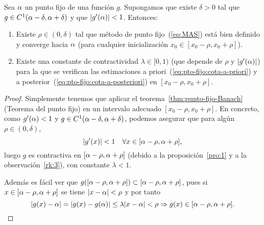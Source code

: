 \begin{theorem}
  \label{thm:punto-fijo-convergencia-local}
  Sea $\alpha$ un punto fijo de una función $g$. Supongamos que existe
  $\delta>0$ tal que $g\in C^1(\alpha-\delta,\alpha+\delta)$ y que
  $|g'(\alpha)|<1$. Entonces:
  \begin{enumerate}
  \item Existe $\rho\in (0,\delta)$ tal que método de punto
    fijo~(\ref{eq:MAS}) está bien definido y converge hacia $\alpha$
    (para cualquier inicialización $x_0 \in [x_0-\rho,x_0+\rho]$).
  \item Existe una constante de contractividad $\lambda\in [0,1)$ (que
    depende de $\rho$ y $|g'(\alpha)|$) para la que se verifican las
    estimaciones a priori~(\ref{eq:pto-fijo:cota-a-priori}) y a
    posterior~(\ref{eq:pto-fijo:cota-a-posteriori}) en
    $[x_0-\rho,x_0+\rho]$.
  \end{enumerate}
  \begin{proof}
    Simplemente tenemos que aplicar el
    teorema~\ref{thm:punto-fijo-Banach} (Teorema del punto fijo) en un
    intervalo adecuado $[x_0-\rho,x_0+\rho]$. En concreto, como
    $g'(\alpha)<1$ y $g \in C^1(\alpha-\delta,\alpha+\delta)$, podemos
    asegurar que para algún $\rho\in(0,\delta)$,
    $$
    |g'(x)|<1 \quad \forall x\in [\alpha-\rho, \alpha+\rho],
    $$
    luego $g$ es contractiva en $[\alpha-\rho, \alpha+\rho]$ (debido a
    la proposición~\ref{pro:1} y a la observación~\ref{rk:3}), con
    constante $\lambda<1$.

    Además es fácil ver que $g([\alpha-\rho, \alpha+\rho]) \subset
    [\alpha-\rho, \alpha+\rho]$, pues si $x\in[\alpha-\rho, \alpha+\rho]$
    se tiene $ |x-\alpha|<\rho$ y por tanto
    $$ 
    |g(x)-\alpha| = |g(x)-g(\alpha)| \le \lambda |x-\alpha|< \rho
    \Rightarrow g(x)\in [\alpha-\rho, \alpha+\rho].
    $$    
  \end{proof}
\end{theorem}

